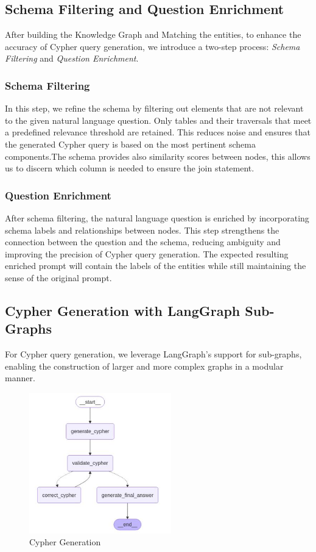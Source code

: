 \subsection{Schema Filtering and Question Enrichment}

After building the Knowledge Graph and Matching the entities, to enhance the accuracy of Cypher query generation, we introduce a two-step process: \textit{Schema Filtering} and \textit{Question Enrichment}.

\subsubsection{Schema Filtering}  
In this step, we refine the schema by filtering out elements that are not relevant to the given natural language question. Only tables and their traversals that meet a predefined relevance threshold are retained. This reduces noise and ensures that the generated Cypher query is based on the most pertinent schema components.The schema provides also similarity scores between nodes, this allows us to discern which column is needed to ensure the join statement.

\subsubsection{Question Enrichment}  
After schema filtering, the natural language question is enriched by incorporating schema labels and relationships between nodes. This step strengthens the connection between the question and the schema, reducing ambiguity and improving the precision of Cypher query generation. The expected resulting enriched prompt will contain the labels of the entities while still maintaining the sense of the original prompt.

\subsection{Cypher Generation with LangGraph Sub-Graphs}
For Cypher query generation, we leverage LangGraph's support for sub-graphs, enabling the construction of larger and more complex graphs in a modular manner. 
\begin{figure}[h]
    \centering
\includegraphics[width=0.55\textwidth]{IMAGES/LangGraph 2.JPG}
    \caption{Cypher Generation}
    \label{fig:Matching Nodes}
\end{figure}


